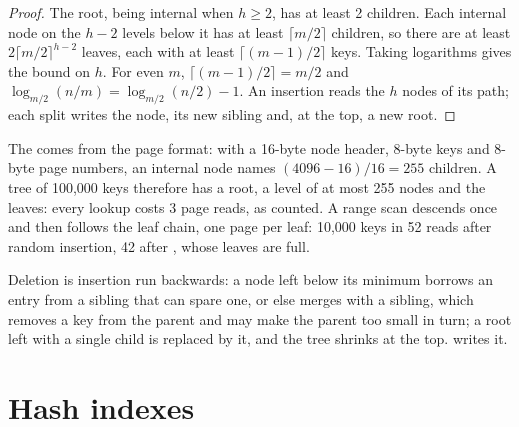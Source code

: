 \begin{proof}
The root, being internal when $h \ge 2$, has at least 2 children. Each internal node on the $h - 2$ levels below it has at least $\lceil m/2 \rceil$ children, so there are at least $2 \lceil m/2 \rceil^{h-2}$ leaves, each with at least $\lceil (m-1)/2 \rceil$ keys. Taking logarithms gives the bound on $h$. For even $m$, $\lceil (m-1)/2 \rceil = m/2$ and $\log_{m/2}(n/m) = \log_{m/2}(n/2) - 1$. An insertion reads the $h$ nodes of its path; each split writes the node, its new sibling and, at the top, a new root.
\end{proof}

\label{out:b3:database-storage:bptree}

The  comes from the page format: with a 16-byte node header, 8-byte keys and 8-byte page numbers, an internal node names $(4096 - 16)/16 = 255$ children. A tree of 100,000 keys therefore has a root, a level of at most 255 nodes and the leaves: every lookup costs 3 page reads, as counted. A range scan descends once and then follows the leaf chain, one page per leaf: 10,000 keys in 52 reads after random insertion, 42 after , whose leaves are full.

\label{lst:b3:database-storage:bulk}

Deletion is insertion run backwards: a node left below its minimum borrows an entry from a sibling that can spare one, or else merges with a sibling, which removes a key from the parent and may make the parent too small in turn; a root left with a single child is replaced by it, and the tree shrinks at the top.  writes it.

\section{Hash indexes}\label{sec:b3:database-storage:hashing}

